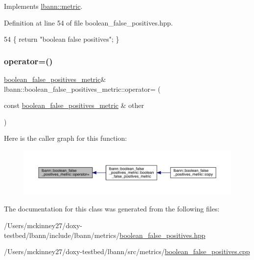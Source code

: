 Implements \hyperlink{classlbann_1_1metric_af455d7b6874d3491bc04f0f2ebfcab51}{lbann\+::metric}.



Definition at line 54 of file boolean\+\_\+false\+\_\+positives.\+hpp.


\begin{DoxyCode}
54 \{ \textcolor{keywordflow}{return} \textcolor{stringliteral}{"boolean false positives"}; \}
\end{DoxyCode}
\mbox{\label{classlbann_1_1boolean__false__positives__metric_a7a459f48be67c7a7d4d3bbb71603b3ea}} 
\subsubsection{\texorpdfstring{operator=()}{operator=()}}
{\footnotesize\ttfamily \hyperlink{classlbann_1_1boolean__false__positives__metric}{boolean\+\_\+false\+\_\+positives\+\_\+metric}\& lbann\+::boolean\+\_\+false\+\_\+positives\+\_\+metric\+::operator= (\begin{DoxyParamCaption}\item[{const \hyperlink{classlbann_1_1boolean__false__positives__metric}{boolean\+\_\+false\+\_\+positives\+\_\+metric} \&}]{other }\end{DoxyParamCaption})\hspace{0.3cm}{\ttfamily [default]}}

Here is the caller graph for this function\+:\nopagebreak
\begin{figure}[H]
\begin{center}
\leavevmode
\includegraphics[width=350pt]{classlbann_1_1boolean__false__positives__metric_a7a459f48be67c7a7d4d3bbb71603b3ea_icgraph}
\end{center}
\end{figure}


The documentation for this class was generated from the following files\+:\begin{DoxyCompactItemize}
\item 
/\+Users/mckinney27/doxy-\/testbed/lbann/include/lbann/metrics/\hyperlink{boolean__false__positives_8hpp}{boolean\+\_\+false\+\_\+positives.\+hpp}\item 
/\+Users/mckinney27/doxy-\/testbed/lbann/src/metrics/\hyperlink{boolean__false__positives_8cpp}{boolean\+\_\+false\+\_\+positives.\+cpp}\end{DoxyCompactItemize}
